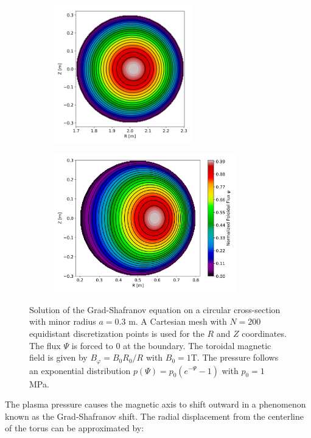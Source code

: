 \begin{figure}[H]
	\centering
	\begin{subfigure}[b]{0.45\textwidth}
		\centering
		\includegraphics[height=60mm]{schemes/Psi_GradShafranov_R_2.png}
		\label{fig:GS_PSI_R_2}
	\end{subfigure}
	\begin{subfigure}[b]{0.45\textwidth}
		\centering
		\includegraphics[height=60mm]{schemes/Psi_GradShafranov_R_0_5.png}
		\label{fig:GS_PSI_R_0_5}
	\end{subfigure}
	\caption{Solution of the Grad-Shafranov equation on a circular cross-section with minor radius $a = 0.3$ m. A Cartesian mesh with $N = 200$ equidistant discretization points is used for the $R$ and $Z$ coordinates. The flux $\Psi$ is forced to 0 at the boundary. The toroidal magnetic field is given by $B_\varphi = B_0 R_0 / R$ with $B_0 = 1$T. The pressure follows an exponential distribution $p(\Psi) = p_0 (e^{-\Psi} - 1)$ with $p_0 = 1$ MPa.}
	\label{fig:1_PsiFlux}
\end{figure}

The plasma pressure causes the magnetic axis to shift outward in a phenomenon known as the Grad-Shafranov shift. The radial displacement from the centerline of the torus can be approximated by:

